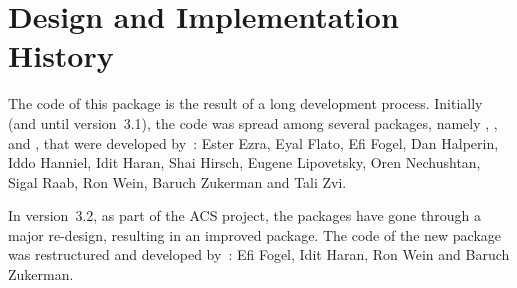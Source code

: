 \section*{Design and Implementation History}

The code of this package is the result of a long development process.
Initially (and until version~3.1), the code was spread among several
packages, namely , ,
 and , that were
developed by~: \newline
Ester Ezra, Eyal Flato, Efi Fogel, Dan Halperin, Iddo Hanniel, Idit Haran,
Shai Hirsch, Eugene Lipovetsky, Oren Nechushtan, Sigal Raab, Ron Wein,
Baruch Zukerman and Tali Zvi.

In version~3.2, as part of the ACS project, the packages have gone through
a major re-design, resulting in an improved  package.
The code of the new package was restructured and developed by~: \newline
Efi Fogel, Idit Haran, Ron Wein and Baruch Zukerman.
